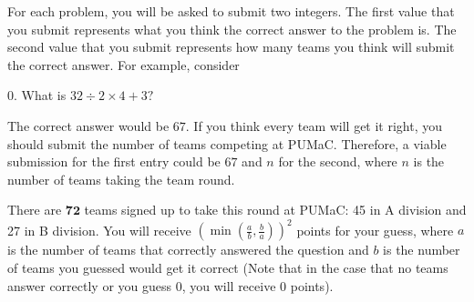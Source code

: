 For each problem, you will be asked to submit two integers. The first value that you submit represents what you think the correct answer to the problem is. The second value that you submit represents how many teams you think will submit the correct answer. For example, consider

0. What is $32\div 2 \times 4 +3?$

The correct answer would be $67$. If you think every team will get it right, you should submit the number of teams competing at PUMaC. Therefore, a viable submission for the first entry could be $67$ and $n$ for the second, where $n$ is the number of teams taking the team round.

There are $\mathbf{72}$ teams signed up to take this round at PUMaC: 45 in A division and 27 in B division. You will receive $\left(\min\left(\tfrac{a}{b},\tfrac{b}{a}\right)\right)^2$ points for your guess, where $a$ is the number of teams that correctly answered the question and $b$ is the number of teams you guessed would get it correct (Note that in the case that no teams answer correctly or you guess $0$,  you will receive $0$ points).